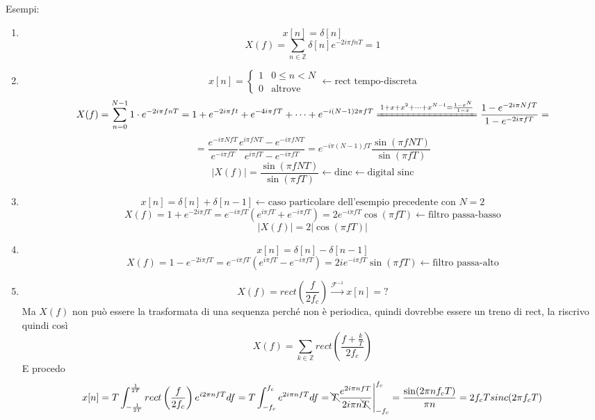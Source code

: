 \documentclass{article}
\newcommand{\antitrasformata}{\xrightarrow{\mathscr{F}^{-1}}}
\begin{document}
Esempi:
\begin{enumerate}
    \item \[x[n]=\delta[n]\]
        \[X(f)=\sum_{n\in\mathbb{Z}}\delta[n]e^{-2i\pi fnT}=1\]
    \item \[x[n]=\begin{cases}
        1&0\leq n<N\\
        0&\text{altrove}
    \end{cases}\leftarrow\text{rect tempo-discreta}\]
        \[X(f)=\sum_{n=0}^{N-1}1\cdot e^{-2i\pi fnT}=1+e^{-2i\pi ft}+e^{-4i\pi fT}+\cdots+e^{-i(N-1)2\pi fT}\xlongequal{1+x+x^2+\cdots+x^{N-1}=\frac{1-x^N}{1-x}}\frac{1-e^{-2i\pi NfT}}{1-e^{-2i\pi fT}}=\]
        \[=\frac{e^{-i\pi NfT}}{e^{-i\pi fT}}\frac{e^{i\pi fNT}-e^{-i\pi fNT}}{e^{i\pi fT}-e^{-i\pi fT}}=e^{-i\pi(N-1)fT}\frac{\sin(\pi fNT)}{\sin(\pi fT)}\]
        \[|X(f)|=\frac{\sin(\pi fNT)}{\sin(\pi fT)}\leftarrow\text{dinc}\leftarrow\text{digital sinc}\]
    \item \[x[n]=\delta[n]+\delta[n-1]\leftarrow\text{caso particolare dell'esempio precedente con }N=2\]
        \[X(f)=1+e^{-2i\pi fT}=e^{-i\pi fT}(e^{i\pi fT}+e^{-i\pi fT})=2e^{-i\pi fT}\cos(\pi fT)\leftarrow\text{filtro passa-basso}\]
        \[|X(f)|=2|\cos(\pi fT)|\]
    \item \[x[n]=\delta[n]-\delta[n-1]\]
        \[X(f)=1-e^{-2i\pi fT}=e^{-i\pi fT}(e^{i\pi fT}-e^{-i\pi fT})=2ie^{-i\pi fT}\sin(\pi fT)\leftarrow\text{filtro passa-alto}\]
    \item \[X(f)=rect\left(\frac{f}{2f_c}\right)\antitrasformata x[n]=?\]
        Ma \(X(f)\) non può essere la trasformata di una sequenza perché non è periodica, quindi dovrebbe essere un treno di rect, la riscrivo quindi così
        \[X(f)=\sum_{k\in\mathbb{Z}}rect\left(\frac{f+\frac{k}{T}}{2f_c}\right)\]
        E procedo
        \[x[n]=T\int_{-\frac{1}{2T}}^{\frac{1}{2T}}rect\left(\frac{f}{2f_c}\right)e^{i2\pi nfT}df=T\int_{-f_c}^{f_c}e^{2i\pi nfT}df=\bcancel{T}\frac{e^{2i\pi nfT}}{2i\pi n\bcancel{T}}\Bigg|_{-f_c}^{f_c}=\frac{\sin(2\pi nf_c T)}{\pi n}=2f_c Tsinc(2\pi f_c T)\]
\end{enumerate}
\end{document}
